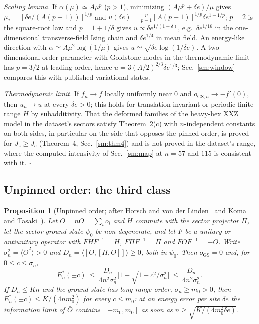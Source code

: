 \documentclass[aps,prx,onecolumn,10pt,nofootinbib,longbibliography,floatfix]{revtex4-2}
\newtheorem{proposition}{Proposition}
\theoremstyle{remark}
\newcommand{\Jz}{J_z}
\newcommand{\de}{\delta e}
\newcommand{\GS}{\mathrm{GS}}
\begin{document}
\emph{Scaling lemma.} If $\alpha(\mu)\simeq A\mu^p$ ($p>1$), minimizing $(A\mu^p+\de)/\mu$ gives %
$\mu_*=[\de/(A(p-1))]^{1/p}$ and $u(\de)=\frac{p}{p-1}[A(p-1)]^{1/p}\de^{1-1/p}$; $p=2$ is the square-root law and %
$p=1+1/\delta$ gives $u\propto\de^{1/(1+\delta)}$, e.g.\ $\de^{1/16}$ in the one-dimensional transverse-field Ising %
chain and $\de^{1/4}$ in mean field. An energy-like direction with $\alpha\simeq A\mu^2\log(1/\mu)$ gives %
$u\simeq\sqrt{\de\log(1/\de)}$. A two-dimensional order parameter with Goldstone modes in the thermodynamic limit has %
$p=3/2$ at leading order, hence $u=3(A/2)^{2/3}\de^{1/3}$; Sec.~\ref{sm:window} compares this with published variational
states.

\emph{Thermodynamic limit.} If $f_n\to f$ locally uniformly near $0$ and $\bar o_{\GS,n}\to-f'(0)$, then $u_n\to u$ at %
every $\de>0$; this holds for translation-invariant or periodic finite-range $H$ by subadditivity. That the %
deformed families of the heavy-hex XXZ model in the dataset's sectors satisfy Theorem~2(c) with $n$-independent %
constants on both sides, in particular on the side that opposes the pinned order, is proved for $\Jz\ge J_c$
(Theorem~4, Sec.~\ref{sm:thm4}) and is not proved in the dataset's range, where the computed %
intensivity of Sec.~\ref{sm:map} at $n=57$ and $115$ is consistent with it. \hfill$\square$

\subsection{Unpinned order: the third class}
\label{sm:unpinned}

\begin{proposition}[Unpinned order; after Horsch and von der Linden~\cite{horsch1988} and Koma and
Tasaki~\cite{koma1994}]
\label{prop:unpinned}
Let $O=n\bar O=\sum_io_i$ and $H$ commute with the sector projector $\Pi$, let the sector ground state $\psi_0$ be
non-degenerate, and let $F$ be a unitary or antiunitary operator with $FHF^{-1}=H$, $F\Pi F^{-1}=\Pi$ and
$FOF^{-1}=-O$. Write $\sigma_n^2=\langle\bar O^2\rangle>0$ and $D_n=\langle[O,[H,O]]\rangle\ge0$, both in $\psi_0$.
Then $\bar o_\GS=0$ and, for $0\le c\le\sigma_n$,
\begin{equation}
E^*_n(\pm c)\ \le\ \frac{D_n}{4n^2\sigma_n^2}\Big[1-\sqrt{1-c^2/\sigma_n^2}\Big]\ \le\ \frac{D_n}{4n^2\sigma_n^2}. %
\label{eq:unpinned}
\end{equation}
If $D_n\le Kn$ and the ground state has long-range order, $\sigma_n\ge m_0>0$, then $E^*_n(\pm c)\le K/(4nm_0^2)$
for every $c\le m_0$: at an energy error per site $\de$ the information limit of $\bar O$ contains $[-m_0,m_0]$ as
soon as $n\ge\sqrt{K/(4m_0^2\de)}$.
\end{proposition}
\end{document}
